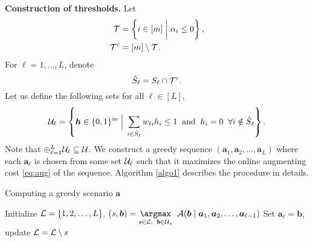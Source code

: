\documentclass[moor]{informs1}              %
\newcommand{\mb}[1]{\ensuremath{\boldsymbol{#1}}}
\newcommand*{\red}{\textcolor{black}}
\begin{document}
\vspace{2mm}
\noindent
{\bf Construction of  thresholds.} Let
\red{$$ 
\begin{aligned}
{\cal T} & = \left\{ i \in [m] \; \bigg\vert \; \alpha_i \leq 0 \right\}, \\
{\cal T}^c & =[m] \setminus {\cal T}.
\end{aligned}
$$}
 For $\ell =1 ,\ldots ,L$, denote $$\hat{S}_{\ell}= S_{\ell} \cap {\cal T}^c.$$ Let us define the following sets for all $\ell \in [L]$,
$$ {\cal U}_{\ell}=  \left\{ \mb h \in \{0,1\}^m  \; \Big\vert \;   \sum_{i \in \hat{S}_{\ell}} w_{\ell i} h_i \leq 1  \; \; \text{and} \; \;  h_i=0  \; \; \forall i  \notin \hat{S}_{\ell}  \right\}.$$
Note that $ \oplus_{\ell=1}^L {\cal U}_{\ell} \subseteq {\cal U}$. We construct a greedy sequence $(\mb a_1 , \mb a_2, \ldots , \mb a_L)$ where each $\mb a_{\ell}$ is chosen from some set ${\cal U}_{\ell}$ such that it maximizes the online augmenting cost \eqref{eq:aug} of the sequence.  Algorithm \ref{algo1} describes the procedure in details.
\begin{algorithm*}[]
\caption{Computing a greedy scenario $\mb a$}\label{algo1}
\begin{algorithmic}[1]
\State Initialize $ {\cal L}= \{ 1,2, \ldots, L \}$.
 \State $(s,\mb b) = \underset{  s \in {\cal L}, \; \;  \mb b \in {\cal U}_s }{\argmax} \; \;  {\cal A}( \mb b \; \vert  \; \mb a_{1}, \mb a_{2}, \ldots , \mb a_{{\ell}-1} )    $
 \State Set $\mb a_{\ell}= \mb b $, update ${\cal L}= {\cal L}\setminus s$
 \EndFor
\end{algorithmic}
\end{algorithm*}
\end{document}
